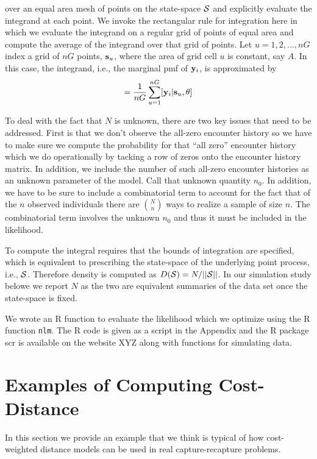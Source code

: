 over an equal area mesh of points on the state-space ${\cal S}$ and explicitly
evaluate the integrand at each point. We invoke the rectangular rule
for integration here
in which we
evaluate the
integrand on a regular grid of points of equal area and compute the
average of
the integrand over that grid of points. 
Let $u=1,2,\ldots,nG$ index a grid of
$nG$ points, ${\bf s}_{u}$,  where the area of grid cell $u$ is
constant, say $A$.
In this case, the integrand, i.e., the marginal pmf of 
${\bf y}_{i}$, is approximated by  
\begin{equation}
         [{\bf y}_{i}|\theta] = \frac{1}{nG} \sum_{u=1}^{nG}  [ {\bf
            y}_{i} |{\bf s}_u, \theta]
\label{mle.eq.intlik}
\end{equation}

To deal with the fact that $N$ is unknown, 
there are two key issues that need to be addressed.
First is that 
we don't observe the all-zero encounter history so we have to
make sure we compute the probability for that ``all zero'' encounter history which
we do operationally by tacking a row of zeros onto the encounter history matrix. In
addition, we include the number of such all-zero encounter histories
as an unknown parameter of the model. Call that unknown quantity $n_{0}$.
In addition, we have to be sure to include a combinatorial term to
account for the fact that of the $n$ observed individuals there are
${N \choose n}$
 ways to realize a sample of size $n$. The combinatorial term
involves the unknown $n_{0}$ and thus it must be included in the likelihood.

To compute the integral requires that the bounds of integration are
specified, which is equivalent to prescribing the state-space of the
underlying point process, i.e., ${\cal S}$. Therefore density is
computed as $D({\cal S}) = N/||{\cal S}||$. In our simulation study
belowe we report $N$ as the two are equivalent summaries of the data
set once the state-space is fixed. 

We wrote an R function to evaluate the likelihood which we optimize
using the R function \mbox{\tt nlm}.
The R code is given as a script in the Appendix and the R package scr
is available on the website XYZ along with functions for simulating
data.


\section{Examples of Computing Cost-Distance}

In this section we provide an example that we think is typical of 
how cost-weighted distance models can be used in real
capture-recapture problems.

